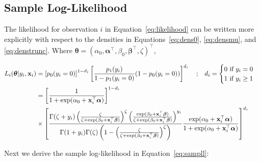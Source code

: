 \documentclass[12pt]{article}
\newcommand{\x}{\mathbf{x}}
\renewcommand{\r}{\right}
\renewcommand{\l}{\left}
\newcommand{\bbeta}{\bm{\beta}}
\newcommand{\balpha}{\bm{\alpha}}
\newcommand{\btheta}{\bm{\theta}}
\begin{document}
\subsection{Sample Log-Likelihood}

The likelihood for observation $i$ in Equation~\ref{eq:likelihood} can be written more explicitly with respect to the densities in Equations~\ref{eq:dens0}, \ref{eq:densmu}, and \ref{eq:denstrunc}. Where $\btheta = (\alpha_0, \balpha^\top, \beta_0, \bbeta^\top, \zeta)^\top$,

\begin{align}
  L_i(\btheta | y_i, \x_i) &= \l[ p_0(y_i = 0) \r]^{1 - d_i} \l[ \frac{p_1(y_i)}{1 - p_1(y_ i = 0)} (1 - p_0(y_i = 0)) \r]^{d_i}
  \quad \text{;} \quad d_i = \begin{cases}
  0 \text{ if } y_i = 0 \\
  1 \text{ if } y_i \geq 1
  \end{cases}  \notag \\
  &= \l[ \frac{1}{1 + \exp(\alpha_0 + \x^\top_i \balpha)} \r]^{1 - d_i} \\
  &\times \l[ \frac{\Gamma (\zeta + y_i) \l( \frac{\zeta}{\zeta + \exp(\beta_0 + \x^\top_i \bbeta)} \r)^\zeta  \l( \frac{\exp(\beta_0 + \x^\top_i \bbeta)}{\zeta + \exp(\beta_0 + \x^\top_i \bbeta)} \r)^{y_i}}{\Gamma(1 + y_i) \Gamma(\zeta) \l( 1 -  \l( \frac{\zeta}{\zeta + \exp(\beta_0 + \x^\top_i \bbeta)} \r)^\zeta \r)} \frac{\exp(\alpha_0 + \x^\top_i \balpha)}{1 + \exp(\alpha_0 + \x^\top_i \balpha)} \r]^{d_i}
\end{align}

Next we derive the sample log-likelihood in Equation~\ref{eq:sampll}:
\end{document}

